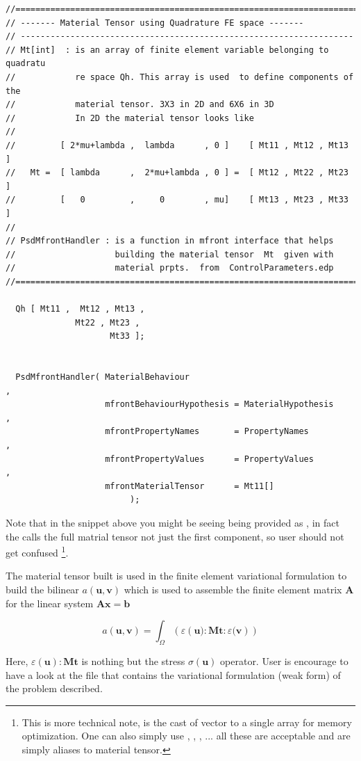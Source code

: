 \begin{lstlisting}[style=CppStyle]
//============================================================================
// ------- Material Tensor using Quadrature FE space -------
// -------------------------------------------------------------------
// Mt[int]  : is an array of finite element variable belonging to quadratu
//            re space Qh. This array is used  to define components of the
//            material tensor. 3X3 in 2D and 6X6 in 3D
//            In 2D the material tensor looks like
//
//         [ 2*mu+lambda ,  lambda      , 0 ]    [ Mt11 , Mt12 , Mt13 ]
//   Mt =  [ lambda      ,  2*mu+lambda , 0 ] =  [ Mt12 , Mt22 , Mt23 ]
//         [   0         ,     0        , mu]    [ Mt13 , Mt23 , Mt33 ]
//
// PsdMfrontHandler : is a function in mfront interface that helps
//                    building the material tensor  Mt  given with
//                    material prpts.  from  ControlParameters.edp
//============================================================================

  Qh [ Mt11 ,  Mt12 , Mt13 ,
              Mt22 , Mt23 ,
                     Mt33 ];


  PsdMfrontHandler( MaterialBehaviour                                   ,
                    mfrontBehaviourHypothesis = MaterialHypothesis      ,
                    mfrontPropertyNames       = PropertyNames           ,
                    mfrontPropertyValues      = PropertyValues          ,
                    mfrontMaterialTensor      = Mt11[]
                         );
\end{lstlisting}

Note that in the snippet above you might be seeing  being
provided as , in fact the  calls
the full matrial tensor not just the first component, so user should not
get confused
\footnote{This is more technical note,  is the cast of  vector to a single array for memory optimization. One can also simply use , , , ... all these are acceptable and are simply aliases to material tensor.}.

The material tensor  built is used in the finite element
variational formulation to build the bilinear
\(a(\mathbf{u},\mathbf{v})\) which is used to assemble the finite
element matrix \(\mathbf{A}\) for the linear system
\(\mathbf{Ax} = \mathbf{b}\)

\[
a(\mathbf{u},\mathbf{v}) = \int_{\Omega}(
                 \varepsilon \left(\mathbf{u}):\mathbf{Mt}:\varepsilon(\mathbf{v}\right)
               )
\]

Here, \(\varepsilon(\mathbf{u}):\mathbf{Mt}\) is nothing but the stress
\(\sigma(\mathbf{u})\) operator. User is encourage to have a look at the
 file that contains the variational
formulation (weak form) of the problem described.
